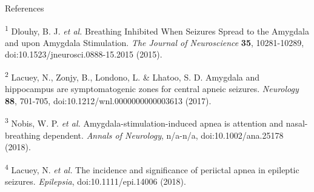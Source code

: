 \documentclass[]{article}
\begin{document}
References

\textsuperscript{1} Dlouhy, B. J. \emph{et al.} Breathing Inhibited When
Seizures Spread to the Amygdala and upon Amygdala Stimulation. \emph{The
Journal of Neuroscience} \textbf{35}, 10281-10289,
doi:10.1523/jneurosci.0888-15.2015 (2015).

\textsuperscript{2} Lacuey, N., Zonjy, B., Londono, L. \& Lhatoo, S. D.
Amygdala and hippocampus are symptomatogenic zones for central apneic
seizures. \emph{Neurology} \textbf{88}, 701-705,
doi:10.1212/wnl.0000000000003613 (2017).

\textsuperscript{3} Nobis, W. P. \emph{et al.}
Amygdala-stimulation-induced apnea is attention and nasal-breathing
dependent. \emph{Annals of Neurology}, n/a-n/a, doi:10.1002/ana.25178
(2018).

\textsuperscript{4} Lacuey, N. \emph{et al.} The incidence and
significance of periictal apnea in epileptic seizures. \emph{Epilepsia},
doi:10.1111/epi.14006 (2018).
\end{document}
